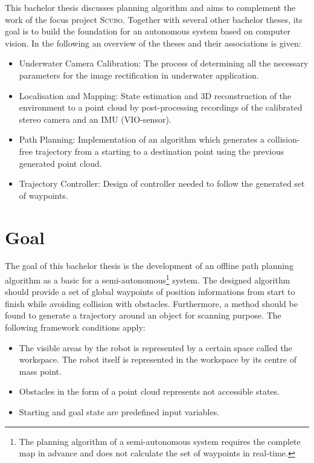 This bachelor thesis discusses planning algorithm and aims to complement the work of the focus project \textsc{Scubo}. Together with several other bachelor theses, its goal is to build the foundation for an autonomous system based on computer vision. In the following an overview of the theses and their associations is given:

\begin{itemize}
	\item
	Underwater Camera Calibration: The process of determining all the necessary parameters for the image rectification in underwater application. 
	\item
	Localisation and Mapping: State estimation and 3D reconstruction of the environment to a point cloud by post-processing recordings of the calibrated stereo camera and an IMU (VIO-sensor). 
	\item
	Path Planning: Implementation of an algorithm which generates a collision-free trajectory from a starting to a destination point using the previous generated point cloud.
	\item 
	Trajectory Controller: Design of controller needed to follow the generated set of waypoints. 
\end{itemize}

\section{Goal}
The goal of this bachelor thesis is the development of an offline path planning algorithm as a basic for a semi-autonomous\footnote{The planning algorithm of a semi-autonomous system requires the complete map in advance and does not calculate the set of waypoints in real-time.} system. The designed algorithm should provide a set of global waypoints of position informations from start to finish while avoiding collision with obstacles. Furthermore, a method should be found to generate a trajectory around an object for scanning purpose. The following framework conditions apply: 

\begin{itemize}
	\item
	The visible areas by the robot is represented by a certain space called the workspace. The robot itself is represented in the workspace by its centre of mass point.  
	\item
	Obstacles in the form of a point cloud represents not accessible states.
	\item
	Starting and goal state are predefined input variables.	
\end{itemize}

	
